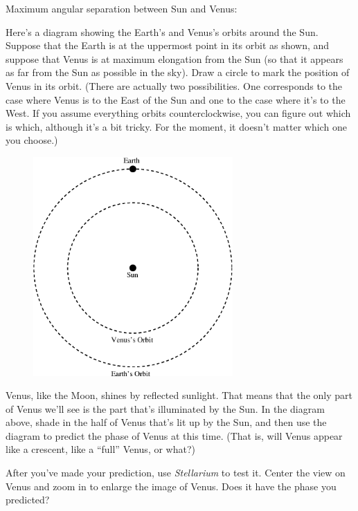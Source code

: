 Maximum angular separation between Sun and Venus:

\answerspace{ 0.7in}

Here's a diagram showing the Earth's and Venus's orbits around the
Sun.  Suppose that the Earth is at the uppermost point in its orbit as
shown, and suppose that Venus is at maximum elongation from the Sun
(so that it appears as far from the Sun as possible in the sky).  Draw
a circle to mark the position of Venus in its orbit.  (There are
actually two possibilities.  One corresponds to the case where Venus
is to the East of the Sun and one to the case where it's to the West.
If you assume everything orbits
counterclockwise, you can figure out which is which, although
it's a bit tricky.  For the moment, it doesn't matter which one you choose.)

\begin{figure}[h]
\centerline{\includegraphics[width=3in]{phasesofvenus/venus1.eps}}
\end{figure}


Venus, like the Moon, shines by reflected sunlight.  That means that
the only part of Venus we'll see is the part that's illuminated by the 
Sun.  In the diagram above, shade in the half of Venus that's lit up by
the Sun, and then use the diagram to predict the phase of Venus
at this time.  (That is, will Venus appear like a crescent, like
a ``full'' Venus, or what?)

\answerspace{ 0.7in}

After you've made your prediction, use \textit{Stellarium}
to test it.
Center the view on Venus and zoom in to enlarge the image of Venus.
Does it have the phase you predicted?

\answerspace{ 0.7in}

